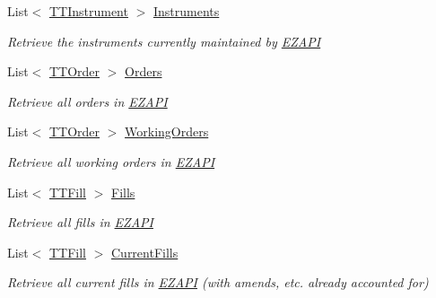\begin{DoxyCompactItemize}
List$<$ \hyperlink{class_e_z_a_p_i_1_1_containers_1_1_t_t_instrument}{T\-T\-Instrument} $>$ \hyperlink{class_e_z_a_p_i_1_1_t_t_a_p_i_functions_a41f8b0400d89627208cdffc8b9eeb7f5}{Instruments}
\begin{DoxyCompactList}\small\item\em Retrieve the instruments currently maintained by \hyperlink{namespace_e_z_a_p_i}{E\-Z\-A\-P\-I} \end{DoxyCompactList}\item 
List$<$ \hyperlink{class_e_z_a_p_i_1_1_containers_1_1_t_t_order}{T\-T\-Order} $>$ \hyperlink{class_e_z_a_p_i_1_1_t_t_a_p_i_functions_adad0bc014e4c2ab2908a9713823ec957}{Orders}
\begin{DoxyCompactList}\small\item\em Retrieve all orders in \hyperlink{namespace_e_z_a_p_i}{E\-Z\-A\-P\-I} \end{DoxyCompactList}\item 
List$<$ \hyperlink{class_e_z_a_p_i_1_1_containers_1_1_t_t_order}{T\-T\-Order} $>$ \hyperlink{class_e_z_a_p_i_1_1_t_t_a_p_i_functions_a287d18ca810f4a76e13f9bb081de50d6}{Working\-Orders}
\begin{DoxyCompactList}\small\item\em Retrieve all working orders in \hyperlink{namespace_e_z_a_p_i}{E\-Z\-A\-P\-I} \end{DoxyCompactList}\item 
List$<$ \hyperlink{class_e_z_a_p_i_1_1_containers_1_1_t_t_fill}{T\-T\-Fill} $>$ \hyperlink{class_e_z_a_p_i_1_1_t_t_a_p_i_functions_aaed71fb16d311ea46994643ff40eab8b}{Fills}
\begin{DoxyCompactList}\small\item\em Retrieve all fills in \hyperlink{namespace_e_z_a_p_i}{E\-Z\-A\-P\-I} \end{DoxyCompactList}\item 
List$<$ \hyperlink{class_e_z_a_p_i_1_1_containers_1_1_t_t_fill}{T\-T\-Fill} $>$ \hyperlink{class_e_z_a_p_i_1_1_t_t_a_p_i_functions_a6a49dc7c0326a25deabb1857abc56cfe}{Current\-Fills}
\begin{DoxyCompactList}\small\item\em Retrieve all current fills in \hyperlink{namespace_e_z_a_p_i}{E\-Z\-A\-P\-I} (with amends, etc. already accounted for) \end{DoxyCompactList}\end{DoxyCompactItemize}
